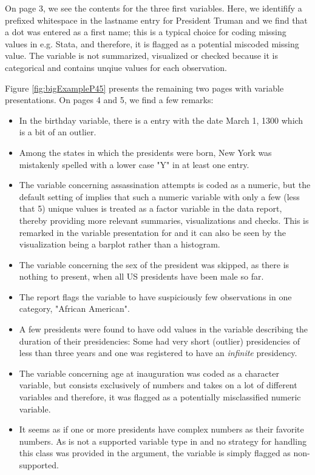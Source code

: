 \documentclass[article,shortnames]{jss}
\begin{document}
On page 3, we see the contents for the three first variables. Here, we identifify a prefixed whitespace in the lastname entry for President Truman and we find that a dot was entered as a first name; this is a typical choice for coding missing values in e.g. Stata, and therefore, it is flagged as a potential miscoded missing value. The variable  is not summarized, visualized or checked because it is categorical and contains unqiue values for each observation. 

Figure \ref{fig:bigExampleP45} presents the remaining two pages with variable presentations. On pages 4 and 5, we find a few remarks:
\begin{itemize}
\item In the birthday variable, there is a entry with the date March 1, 1300 which is a bit of an outlier. 
\item Among the states in which the presidents were born, New York was mistakenly spelled with a lower case "Y" in at least one entry.
\item The variable concerning assassination attempts is coded as a numeric, but the default  setting of  implies that such a numeric variable with only a few (less that 5) unique values is treated as a factor variable in the data report, thereby providing more relevant summaries, visualizations and checks. This is remarked in the variable presentation for  and it can also be seen by the visualization being a barplot rather than a histogram.
\item The variable concerning the sex of the president was skipped, as there is nothing to present, when all US presidents have been male so far.
\item The report flags the variable  to have suspiciously few observations in one category, "African American". 
\item A few presidents were found to have odd values in the variable describing the duration of their presidencies: Some had very short (outlier) presidencies of less than three years and one was registered to have an \textit{infinite} presidency. 
\item The variable concerning age at inauguration was coded as a character variable, but consists exclusively of numbers and takes on a lot of different variables and therefore, it was flagged as a potentially misclassified numeric variable.
\item It seems as if one or more presidents have complex numbers as their favorite numbers. As  is not a supported variable type in  and no strategy for handling this class was provided in the  argument, the variable is simply flagged as non-supported.
\end{itemize}
\end{document}

